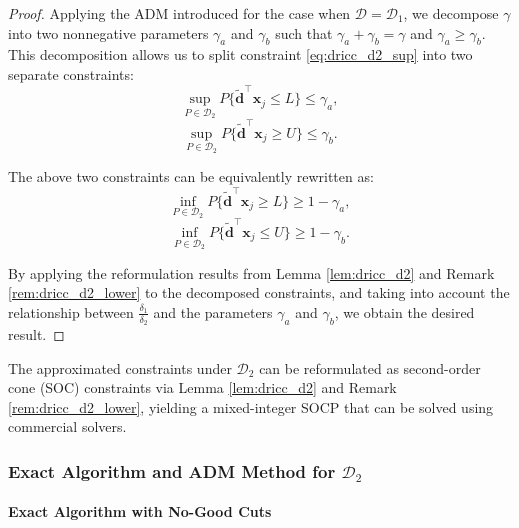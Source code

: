\documentclass[preprint,12pt,authoryear]{elsarticle}
\begin{document}
\begin{proof}
Applying the ADM introduced for the case when $\mathcal{D} = \mathcal{D}_1$, we decompose $\gamma$ into two nonnegative parameters $\gamma_a$ and $\gamma_b$ such that $\gamma_a + \gamma_b = \gamma$ and $\gamma_a \geqslant \gamma_b$. This decomposition allows us to split constraint \eqref{eq:dricc_d2_sup} into two separate constraints:
\begin{equation}
\sup_{P \in \mathcal{D}_2} P \{\widetilde{\mathbf{d}}^\top \mathbf{x}_j \leqslant L\} \leqslant \gamma_a,
\end{equation}
\begin{equation}
\sup_{P \in \mathcal{D}_2} P \{\widetilde{\mathbf{d}}^\top \mathbf{x}_j \geqslant U\} \leqslant \gamma_b.
\end{equation}

The above two constraints can be equivalently rewritten as:
\begin{equation}
\inf_{P \in \mathcal{D}_2} P \{\widetilde{\mathbf{d}}^\top \mathbf{x}_j \geqslant L\} \geqslant 1 - \gamma_a,
\end{equation}
\begin{equation}
\inf_{P \in \mathcal{D}_2} P \{\widetilde{\mathbf{d}}^\top \mathbf{x}_j \leqslant U\} \geqslant 1 - \gamma_b.
\end{equation}

By applying the reformulation results from Lemma \ref{lem:dricc_d2} and Remark \ref{rem:dricc_d2_lower} to the decomposed constraints, and taking into account the relationship between $\frac{\delta_1}{\delta_2}$ and the parameters $\gamma_a$ and $\gamma_b$, we obtain the desired result.
\end{proof}

The approximated constraints under $\mathcal{D}_2$ can be reformulated as second-order cone (SOC) constraints via Lemma \ref{lem:dricc_d2} and Remark \ref{rem:dricc_d2_lower}, yielding a mixed-integer SOCP that can be solved using commercial solvers.

\subsubsection{Exact Algorithm and ADM Method for $\mathcal{D}_2$}

\paragraph{Exact Algorithm with No-Good Cuts}
\end{document}
